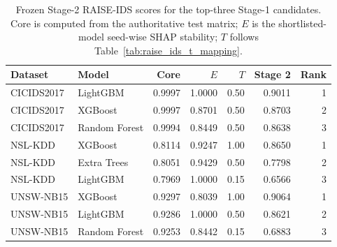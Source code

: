 \begin{table}[!htbp]
\centering
\caption{Frozen Stage-2 RAISE-IDS scores for the top-three Stage-1 candidates. Core is computed from the authoritative test matrix; $E$ is the shortlisted-model seed-wise SHAP stability; $T$ follows Table~\ref{tab:raise_ids_t_mapping}.}
\label{tab:raise_ids_stage2_scores}
\small
\begin{tabular}{llrrrrr}
\toprule
Dataset & Model & Core & $E$ & $T$ & Stage 2 & Rank \\
\midrule
CICIDS2017 & LightGBM & 0.9997 & 1.0000 & 0.50 & 0.9011 & 1 \\
CICIDS2017 & XGBoost & 0.9997 & 0.8701 & 0.50 & 0.8703 & 2 \\
CICIDS2017 & Random Forest & 0.9994 & 0.8449 & 0.50 & 0.8638 & 3 \\
NSL-KDD & XGBoost & 0.8114 & 0.9247 & 1.00 & 0.8650 & 1 \\
NSL-KDD & Extra Trees & 0.8051 & 0.9429 & 0.50 & 0.7798 & 2 \\
NSL-KDD & LightGBM & 0.7969 & 1.0000 & 0.15 & 0.6566 & 3 \\
UNSW-NB15 & XGBoost & 0.9297 & 0.8039 & 1.00 & 0.9064 & 1 \\
UNSW-NB15 & LightGBM & 0.9286 & 1.0000 & 0.50 & 0.8621 & 2 \\
UNSW-NB15 & Random Forest & 0.9253 & 0.8442 & 0.15 & 0.6883 & 3 \\
\bottomrule
\end{tabular}
\end{table}
